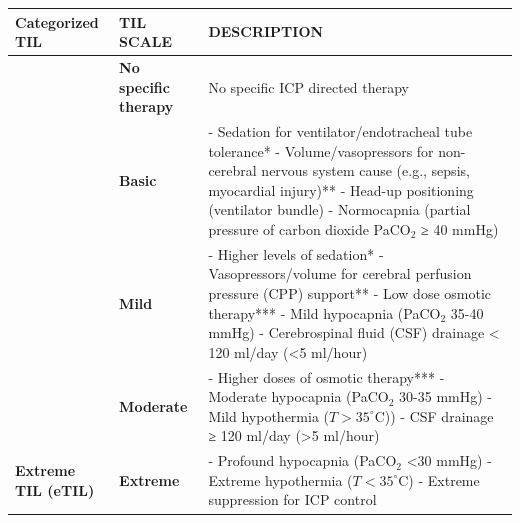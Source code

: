 \begin{table}[h!]
    \centering
    \renewcommand{\arraystretch}{1.5} %
    \begin{adjustbox}{width=0.8\textwidth}
    \begin{tabular}{|>{\raggedright\arraybackslash}p{4cm}|>{\raggedright\arraybackslash}p{4cm}|>{\raggedright\arraybackslash}p{10cm}|}
        \hline
        \textbf{Categorized TIL} & \textbf{TIL SCALE} & \textbf{DESCRIPTION} \\
        \hline
        \multirow{2}{*}{\textbf{TIL 1}} 
        & \textbf{No specific therapy} & No specific ICP directed therapy \\
        \cline{2-3}
        & \textbf{Basic} 
        & - Sedation for ventilator/endotracheal tube tolerance* \newline 
        - Volume/vasopressors for non-cerebral nervous system cause (e.g., sepsis, myocardial injury)** \newline 
        - Head-up positioning (ventilator bundle) \newline 
        - Normocapnia (partial pressure of carbon dioxide PaCO$_2$ ≥ 40 mmHg) \\
        \hline
        \multirow{2}{*}{\textbf{TIL 2-3}} 
        & \textbf{Mild} 
        & - Higher levels of sedation* \newline 
        - Vasopressors/volume for cerebral perfusion pressure (CPP) support** \newline 
        - Low dose osmotic therapy*** \newline 
        - Mild hypocapnia (PaCO$_2$ 35-40 mmHg) \newline 
        - Cerebrospinal fluid (CSF) drainage < 120 ml/day (<5 ml/hour) \\
        \cline{2-3}
        & \textbf{Moderate} 
        & - Higher doses of osmotic therapy*** \newline 
        - Moderate hypocapnia (PaCO$_2$ 30-35 mmHg) \newline 
        - Mild hypothermia ($T>35^\circ\text{C}$)) \newline 
        - CSF drainage ≥ 120 ml/day (>5 ml/hour) \\
        \hline
        \textbf{Extreme TIL (eTIL)} 
        & \textbf{Extreme} 
        & - Profound hypocapnia (PaCO$_2$ <30 mmHg) \newline 
        - Extreme hypothermia ($T<35^\circ\text{C}$) \newline 
        - Extreme suppression for ICP control \newline 

\end{tabular}
\end{adjustbox}
\end{table}
